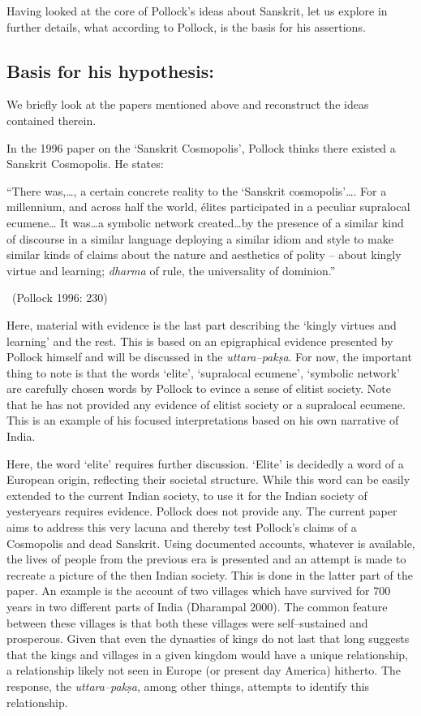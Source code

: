 Having looked at the core of Pollock’s ideas about Sanskrit, let us explore in further details, what according to Pollock, is the basis for his assertions.

\subsection*{Basis for his hypothesis:}

We briefly look at the papers mentioned above and reconstruct the ideas contained therein.

In the 1996 paper on the ‘Sanskrit Cosmopolis’, Pollock thinks there existed a Sanskrit Cosmopolis. He states:

\begin{myquote}
“There was,…, a certain concrete reality to the ‘Sanskrit cosmopolis’…. For a millennium, and across half the world, élites participated in a peculiar supralocal ecumene… It was…a symbolic network created…by the presence of a similar kind of discourse in a similar language deploying a similar idiom and style to make similar kinds of claims about the nature and aesthetics of polity – about kingly virtue and learning; \textit{dharma} of rule, the universality of dominion.” 

~\hfill (Pollock 1996: 230)
\end{myquote}

Here, material with evidence is the last part describing the ‘kingly virtues and learning’ and the rest. This is based on an epigraphical evidence presented by Pollock himself and will be discussed in the \textit{uttara–pakṣa}. For now, the important thing to note is that the words ‘elite’, ‘supralocal ecumene’, ‘symbolic network’ are carefully chosen words by Pollock to evince a sense of elitist society. Note that he has not provided any evidence of elitist society or a supralocal ecumene. This is an example of his focused interpretations based on his own narrative of India.

Here, the word ‘elite’ requires further discussion. ‘Elite’ is decidedly a word of a European origin, reflecting their societal structure. While this word can be easily extended to the current Indian society, to use it for the Indian society of yesteryears requires evidence. Pollock does not provide any. The current paper aims to address this very lacuna and thereby test Pollock’s claims of a Cosmopolis and dead Sanskrit. Using documented accounts, whatever is available, the lives of people from the previous era is presented and an attempt is made to recreate a picture of the then Indian society. This is done in the latter part of the paper. An example is the account of two villages which have survived for 700 years in two different parts of India (Dharampal 2000). The common feature between these villages is that both these villages were self–sustained and prosperous. Given that even the dynasties of kings do not last that long suggests that the kings and villages in a given kingdom would have a unique relationship, a relationship likely not seen in Europe (or present day America) hitherto. The response, the \textit{uttara–pakṣa}, among other things, attempts to identify this relationship.

